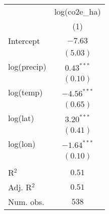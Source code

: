 
\begin{tabular}{l c}
\hline
 & log(co2e\_ha) \\
 & (1)\\
\hline
Intercept                               & $-7.63$      \\
                                          & $(5.03)$        \\
log(precip)                   & $0.43^{***}$                   \\
                                          & $(0.10)$                       \\
log(temp)                     & $-4.56^{***}$                 \\
                                          & $(0.65)$                      \\
log(lat)                                  & $3.20^{***}$                  \\
                                          & $(0.41)$                      \\
log(lon)                                  & $-1.64^{***}$                 \\
                                          & $(0.10)$                       \\

& \\
R$^2$                                     & $0.51$       \\
Adj. R$^2$                                & $0.51$             \\
Num. obs.                                 & $538$             \\
\hline

\end{tabular}

